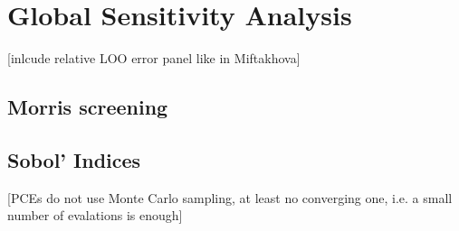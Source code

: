 \section{Global Sensitivity Analysis}
\thispagestyle{plain} %

[inlcude relative LOO error panel like in Miftakhova]

\subsection{Morris screening}
\subsection{Sobol' Indices}



[PCEs do not use Monte Carlo sampling, at least no converging one, i.e. a small number of evalations is enough]